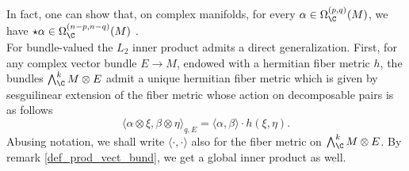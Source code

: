 In fact, one can show that, on complex manifolds, for every \(\alpha \in \Omega_\C^{(p,q)}(M)\), we have \(\star  \alpha \in \Omega_\C^{(n-p, n-q)}(M)\) \parencite[Lemma 9.23-(b)]{lee_introCM}.  \\

For bundle-valued the \(L_2\) inner product admits a direct generalization. First, for any complex vector bundle \(E \to M\), endowed with a hermitian fiber metric \(h\), the bundles \(\bigwedge^k_\C  M \otimes E\) admit a unique hermitian fiber metric which is given by sesguilinear extension of the fiber metric whose action on decomposable pairs is as follows
\[
\langle \alpha \otimes \xi, \beta \otimes \eta \rangle_{q, E}=\langle \alpha, \beta \rangle \cdot h(\xi, \eta).
\]
Abusing notation, we shall write \(\langle \cdot, \cdot \rangle\) also for the fiber metric on \(\bigwedge^k_\C  M \otimes E\). By remark \ref{def_prod_vect_bund}, we get a global inner product as well. \\


